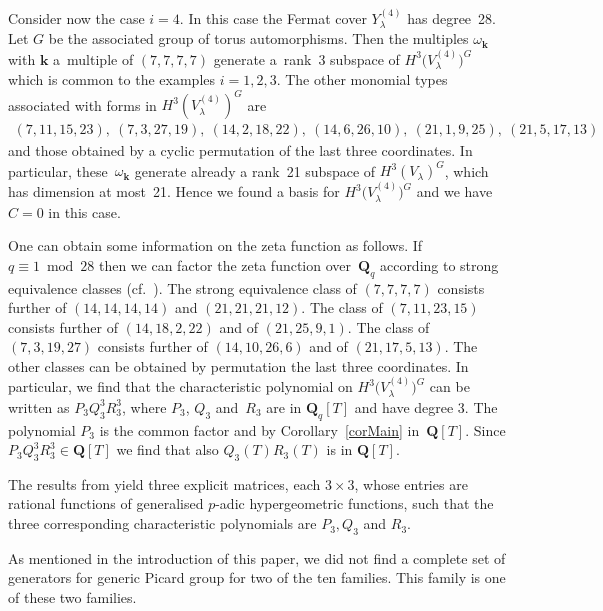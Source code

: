 \documentclass[pdftex]{sigma}
\numberwithin{equation}{section}
\begin{document}
\begin{Example} Consider now the case $i=4$. In this case the Fermat cover $Y_{\lambda}^{(4)}$ has degree~28. Let $G$ be the associated group of torus automorphisms. Then the multiples $\omega_{\mathbf{k}}$ with $\mathbf{k}$ a~multiple of $(7,7,7,7)$ generate a~rank~3 subspace of $H^3\big(V_{\lambda}^{(4)}\big)^G$ which is common to the examples $i=1,2,3$. The other monomial types associated with forms in $H^3(V_{\lambda}^{(4)})^G$ are
\begin{gather*} (7,11,15,23),\ (7,3,27,19),\ (14,2,18,22), \ (14,6,26,10), \ (21,1,9,25), \ (21,5,17,13)\end{gather*}
and those obtained by a cyclic permutation of the last three coordinates. In particular, these~$\omega_{\mathbf{k}}$ generate already a rank~21 subspace of $H^3(V_\lambda)^G$, which has dimension at most~21. Hence we found a basis for $H^3\big(V_{\lambda}^{(4)}\big)^G$ and we have $C=0$ in this case.

One can obtain some information on the zeta function as follows. If $q\equiv 1 \bmod 28$ then we can factor the zeta function over~$\mathbf{Q}_q$ according to strong equivalence classes (cf.\ \cite[Section~4]{Zetafamrec}). The strong equivalence class of $(7,7,7,7)$ consists further of $(14,14,14,14)$ and $(21,21,21,12)$. The class of $(7,11,23,15)$ consists further of $(14,18,2,22)$ and of $(21,25,9,1)$. The class of $(7,3,19,27)$ consists further of $(14,10,26,6)$ and of $(21,17,5,13)$. The other classes can be obtained by permutation the last three coordinates. In particular, we f\/ind that the characteristic polynomial on $H^3\big(V_{\lambda}^{(4)}\big)^G$ can be written as $P_3Q_3^3R_3^3$, where $P_3$, $Q_3$ and~$R_3$ are in $\mathbf{Q}_q[T]$ and have degree 3. The polynomial $P_3$ is the common factor and by Corollary~\ref{corMain} in~$\mathbf{Q}[T]$. Since $P_3Q_3^3R_3^3\in \mathbf{Q}[T]$ we f\/ind that also $Q_3(T)R_3(T)$ is in $\mathbf{Q}[T]$.

The results from \cite[Section 5]{zetafam} yield three explicit matrices, each $3\times 3$, whose entries are rational functions of generalised $p$-adic hypergeometric functions, such that the three corresponding characteristic polynomials are $P_3, Q_3$ and $R_3$.

As mentioned in the introduction of this paper, we did not f\/ind a complete set of generators for generic Picard group for two of the ten families. This family is one of these two families.
\end{Example}
\end{document}
